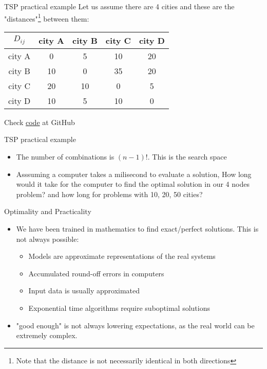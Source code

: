 \documentclass[c]{beamer}
\begin{document}
\begin{frame}{TSP practical example}
  Let us assume there are 4 cities and these are the "distances"\footnote{Note that the distance is not necessarily identical in both directions} between them:
  \begin{center}
  \begin{tabular}{c|cccc}
    $D_{ij}$ & city A & city B & city C & city D \\\hline
    city A & 0 & 5 & 10 & 20  \\
    city B & 10 & 0 & 35 & 20  \\
    city C & 20 & 10 & 0 & 5 \\
    city D & 10 & 5 & 10 & 0
  \end{tabular}
  \end{center}
  Check \href{https://github.com/JordiVillaFreixa/ORcourse/blob/main/code/TSPnaive.ipynb}{code} at GitHub 
\end{frame}

\begin{frame}{TSP practical example}
  \begin{itemize}
    \item The number of combinations is $(n-1)!$. This is the search space
    \item Asssuming a computer takes a milisecond to evaluate a solution, How long would it take for the computer to find the optimal solution in our 4 nodes problem? and how long for problems with 10, 20, 50 cities?
  \end{itemize}
\end{frame}

\begin{frame}{Optimality and Practicality}
  \begin{itemize}
    \item We have been trained in mathematics to find exact/perfect solutions. This is not always possible:
    \begin{itemize}
      \item Models are approximate representations of the real systems
      \item Accumulated round-off errors in computers
      \item Input data is usually approximated
      \item Exponential time algorithms require suboptimal solutions
    \end{itemize}
    \item "good enough" is not always lowering expectations, as the real world can be extremely complex.
  \end{itemize}
\end{frame}
\end{document}
